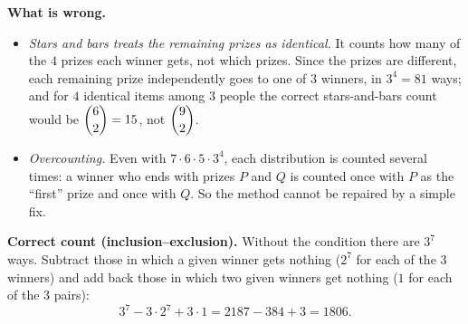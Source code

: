 \textbf{What is wrong.}
\begin{itemize}
\item \emph{Stars and bars treats the remaining prizes as identical.} It counts how many of the $4$ prizes each winner gets, not which prizes. Since the prizes are different, each remaining prize independently goes to one of $3$ winners, in $3^4=81$ ways; and for $4$ identical items among $3$ people the correct stars-and-bars count would be $\dbinom62=15$, not $\dbinom92$.
\item \emph{Overcounting.} Even with $7\cdot6\cdot5\cdot3^4$, each distribution is counted several times: a winner who ends with prizes $P$ and $Q$ is counted once with $P$ as the ``first'' prize and once with $Q$. So the method cannot be repaired by a simple fix.
\end{itemize}

\textbf{Correct count (inclusion--exclusion).} Without the condition there are $3^7$ ways. Subtract those in which a given winner gets nothing ($2^7$ for each of the $3$ winners) and add back those in which two given winners get nothing ($1$ for each of the $3$ pairs):
\[
3^7-3\cdot2^7+3\cdot1=2187-384+3=\boxed{1806}.
\]
